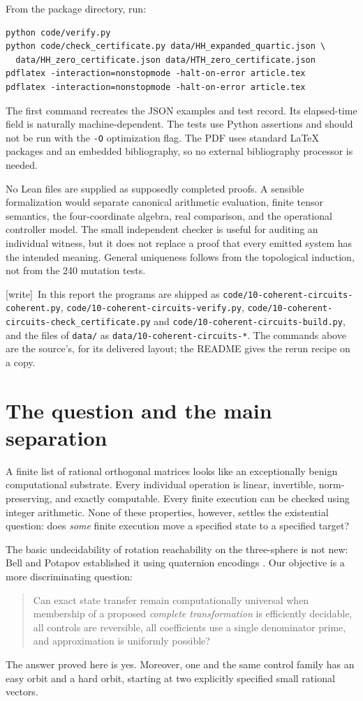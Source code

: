 \documentclass[11pt,letterpaper]{article}
\numberwithin{equation}{section}
\theoremstyle{definition}
\theoremstyle{remark}
\newcommand{\code}[1]{\nolinkurl{#1}}
\newcommand{\wtag}{\textup{[write]}}
\newcommand{\srcmark}[1]{\par\noindent{\small\itshape [source~#1]}\par}
\begin{document}
From the package directory, run:
\begin{lstlisting}
python code/verify.py
python code/check_certificate.py data/HH_expanded_quartic.json \
  data/HH_zero_certificate.json data/HTH_zero_certificate.json
pdflatex -interaction=nonstopmode -halt-on-error article.tex
pdflatex -interaction=nonstopmode -halt-on-error article.tex
\end{lstlisting}
The first command recreates the JSON examples and test record. Its elapsed-time
field is naturally machine-dependent. The tests use Python assertions and
should not be run with the \texttt{-O} optimization flag. The PDF uses standard
LaTeX packages and an embedded bibliography, so no external bibliography
processor is needed.

No Lean files are supplied as supposedly completed proofs. A sensible
formalization would separate canonical arithmetic evaluation, finite tensor
semantics, the four-coordinate algebra, real comparison, and the operational
controller model. The small independent checker is useful for auditing an
individual witness, but it does not replace a proof that every emitted system
has the intended meaning. General uniqueness follows from the topological
induction, not from the 240 mutation tests.

\wtag\ In this report the programs are shipped as
\code{code/10-coherent-circuits-coherent.py},
\code{code/10-coherent-circuits-verify.py},
\code{code/10-coherent-circuits-check_certificate.py} and
\code{code/10-coherent-circuits-build.py}, and the files of \code{data/} as
\code{data/10-coherent-circuits-*}. The commands above are the source's, for
its delivered layout; the README gives the rerun recipe on a copy.

\section{The question and the main separation}
\label{pqc:rr:sec:intro}
\srcmark{11}

A finite list of rational orthogonal matrices looks like an exceptionally
benign computational substrate. Every individual operation is linear,
invertible, norm-preserving, and exactly computable. Every finite execution
can be checked using integer arithmetic. None of these properties, however,
settles the existential question: does \emph{some} finite execution move a
specified state to a specified target?

The basic undecidability of rotation reachability on the three-sphere is
not new: Bell and Potapov established it using quaternion encodings
\cite{b62-bell-potapov}. Our objective is a more discriminating question:
\begin{quote}
Can exact state transfer remain computationally universal when membership
of a proposed \emph{complete transformation} is efficiently decidable,
all controls are reversible, all coefficients use a single denominator
prime, and approximation is uniformly possible?
\end{quote}
The answer proved here is yes. Moreover, one and the same control family
has an easy orbit and a hard orbit, starting at two explicitly specified
small rational vectors.
\end{document}
